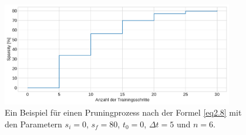 \begin{figure}[htbp]
\centerline{\includegraphics[width=0.9\textwidth]{content/images/magnitude_pruning_schedule.pdf}}
\caption{Ein Beispiel für einen Pruningprozess nach der Formel \ref{eq2.8} mit den Parametern $s_i = 0$, $s_f = 80$, $t_0 = 0$, $\Delta t = 5$ und $n = 6$.}
\label{f2.9}
\end{figure}
